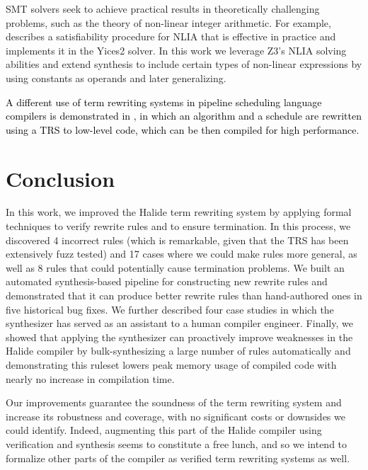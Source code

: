 \documentclass[acmsmall,review]{acmart}\settopmatter{printfolios=true,printccs=false,printacmref=false}
\newcommand{\modified}[1]{\textcolor{black}{{#1}}}
\newcommand{\NumRulesFixed}{{\color{black} 4}\xspace}
\newcommand{\NumPredicatesRelaxed}{{\color{black} 17}\xspace}
\newcommand{\NumOrderingProblems}{{\color{black} 8}\xspace}
\newcommand{\NumRulesSynthesized}{{\color{black} 4127}\xspace}
\begin{document}
SMT solvers seek to achieve practical results in theoretically challenging problems, such as the theory of non-linear integer arithmetic. For example, \citet{jovanovic2017solving} describes a satisfiability procedure for NLIA that is effective in practice and implements it in the Yices2 solver. In this work we leverage Z3's NLIA solving abilities and extend synthesis to include certain types of non-linear expressions by using constants as operands and later generalizing.

\modified{A different use of term rewriting systems in pipeline scheduling language
compilers is demonstrated in \cite{hagedorn2020achieving}, in which an algorithm
and a schedule are rewritten using a TRS to low-level code, which can be then compiled
for high performance.}

\section{Conclusion}
\label{sec:conclusion}
In this work, we improved the Halide term rewriting system by applying formal
techniques to verify rewrite rules and to ensure termination.  In this process,
we discovered \NumRulesFixed incorrect rules (which is remarkable,
given that the TRS has been extensively fuzz tested) and \NumPredicatesRelaxed cases
where we could make rules more general, as well as \NumOrderingProblems rules
that could potentially cause termination problems.  We built
an automated synthesis-based pipeline for constructing new rewrite rules
and demonstrated that it can produce better rewrite rules than hand-authored ones
in five historical bug fixes. We further described four case studies in which the
synthesizer has served as an assistant to a human compiler engineer. Finally,
we showed that applying the synthesizer can proactively improve weaknesses
in the Halide compiler by bulk-synthesizing a large number of rules automatically
and demonstrating this ruleset lowers peak memory usage of compiled code with nearly
no increase in compilation time.

Our improvements guarantee the soundness of the term rewriting system
and increase its robustness and coverage, with no significant costs or
downsides we could identify. Indeed, augmenting this part of the
Halide compiler using verification and synthesis seems to constitute a
free lunch, and so we intend to formalize other parts of the compiler as
verified term rewriting systems as well.
\end{document}

